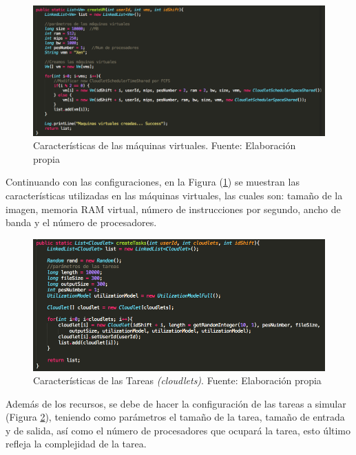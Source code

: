 \setcounter{figure}{9}
\renewcommand\thefigure{\arabic{figure}}
\begin{figure}[h!]
	\centering
	\includegraphics[scale=0.3]{media/creacion_vm}
	\caption{Características de las máquinas virtuales. Fuente: Elaboración propia}
	\label{fig:VCar}
\end{figure}


Continuando con las configuraciones, en la Figura (\ref{fig:VCar}) se muestran las caracter\'isticas utilizadas en las m\'aquinas virtuales, las cuales son: tamaño de la imagen, memoria RAM virtual, n\'umero de instrucciones por segundo, ancho de banda y el n\'umero de procesadores.


\setcounter{figure}{10}
\renewcommand\thefigure{\arabic{figure}}
\begin{figure}[h!]
	\centering
	\includegraphics[scale=0.5]{media/creacion_cloudlet}
	\caption{Características de las Tareas \textit{(cloudlets)}. Fuente: Elaboración propia}
	\label{fig:TCar}
\end{figure} 




\newpage

Adem\'as de los recursos, se debe de hacer la configuraci\'on de las tareas a simular (Figura \ref{fig:TCar}), teniendo como par\'ametros el tamaño de la tarea, tamaño de entrada y de salida, as\'i como el número de procesadores que ocupar\'a la tarea, esto \'ultimo refleja la complejidad de la tarea.


